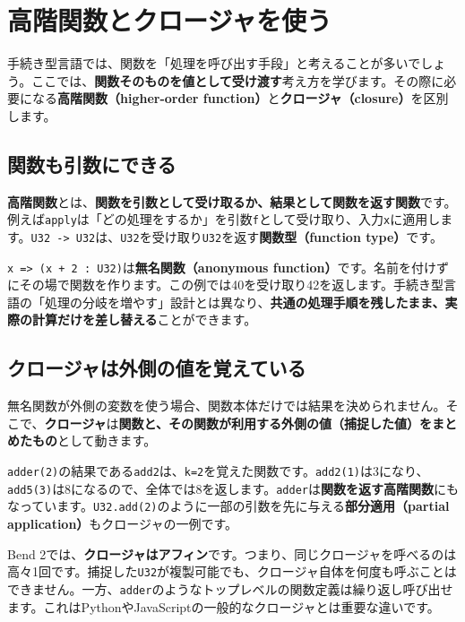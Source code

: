 \documentclass[11pt,a4paper,openany]{book}
\newcommand{\code}[1]{\texttt{#1}}
\newcommand{\term}[1]{\textbf{#1}}
\newcommand{\readcode}[2]{}
\begin{document}
\chapter{高階関数とクロージャを使う}
\begin{tcolorbox}[colback=blue!3,colframe=blue!16,boxrule=.35pt,arc=1mm,left=3mm,right=3mm,top=2mm,bottom=2mm]
\small 手続き型言語では、関数を「処理を呼び出す手段」と考えることが多いでしょう。ここでは、\textbf{関数そのものを値として受け渡す}考え方を学びます。その際に必要になる\term{高階関数（higher-order function）}と\term{クロージャ（closure）}を区別します。
\end{tcolorbox}

\section{関数も引数にできる}
\term{高階関数}とは、\textbf{関数を引数として受け取るか、結果として関数を返す関数}です。例えば\code{apply}は「どの処理をするか」を引数\code{f}として受け取り、入力\code{x}に適用します。\code{U32 -> U32}は、\code{U32}を受け取り\code{U32}を返す\term{関数型（function type）}です。
\readcode{29_higher_order.bend}{関数を引数に渡す（29\_higher\_order.bend）}
\code{x => (x + 2 : U32)}は\term{無名関数（anonymous function）}です。名前を付けずにその場で関数を作ります。この例では40を受け取り42を返します。手続き型言語の「処理の分岐を増やす」設計とは異なり、\textbf{共通の処理手順を残したまま、実際の計算だけを差し替える}ことができます。

\section{クロージャは外側の値を覚えている}
無名関数が外側の変数を使う場合、関数本体だけでは結果を決められません。そこで、\term{クロージャ}は\textbf{関数と、その関数が利用する外側の値（捕捉した値）をまとめたもの}として動きます。
\readcode{15_closure.bend}{異なる値を捕捉する二つのクロージャ（15\_closure.bend）}
\code{adder(2)}の結果である\code{add2}は、\code{k=2}を覚えた関数です。\code{add2(1)}は3になり、\code{add5(3)}は8になるので、全体では8を返します。\code{adder}は\textbf{関数を返す高階関数}にもなっています。\code{U32.add(2)}のように一部の引数を先に与える\term{部分適用（partial application）}もクロージャの一例です。

\begin{cautionbox}
Bend 2では、\textbf{クロージャはアフィン}です。つまり、同じクロージャを呼べるのは高々1回です。捕捉した\code{U32}が複製可能でも、クロージャ自体を何度も呼ぶことはできません。一方、\code{adder}のようなトップレベルの関数定義は繰り返し呼び出せます。これはPythonやJavaScriptの一般的なクロージャとは重要な違いです。
\end{cautionbox}
\end{document}
